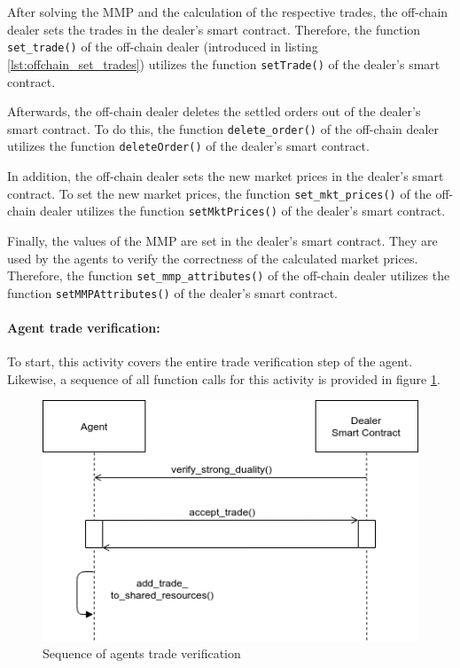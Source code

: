 After solving the MMP and the calculation of the respective 
trades, the off-chain dealer sets the trades in the dealer's smart contract.
Therefore, the function \verb|set_trade()| of the off-chain dealer (introduced in listing \ref{lst:offchain_set_trades})
utilizes the function \verb|setTrade()| of the dealer's smart contract.

Afterwards, the off-chain dealer deletes the settled orders out of the dealer's
smart contract. 
To do this, the function \verb|delete_order()| of the off-chain dealer
utilizes the function \verb|deleteOrder()| of the dealer's smart contract.

In addition, the off-chain dealer sets the new market prices in the dealer's smart contract.
To set the new market prices, the function \verb|set_mkt_prices()| of the off-chain dealer 
utilizes the function \verb|setMktPrices()| of the dealer's smart contract.

Finally, the values of the MMP are set in the dealer's smart contract. 
They are used by the agents to verify the correctness of the calculated market prices.
Therefore, the function \verb|set_mmp_attributes()| of the off-chain dealer
utilizes the function \verb|setMMPAttributes()| of the dealer's smart contract.

\paragraph{Agent trade verification:}
To start, this activity covers the entire trade verification step of the agent. 
Likewise, a sequence of all function 
calls for this activity is provided in figure \ref{figure:agents_trade_verification}.

\begin{figure}[htbp]
	\centering
	\includegraphics[width=.8\linewidth]{./figures/trade_verification.png}
	\caption{Sequence of agents trade verification}
	\label{figure:agents_trade_verification}
\end{figure}

